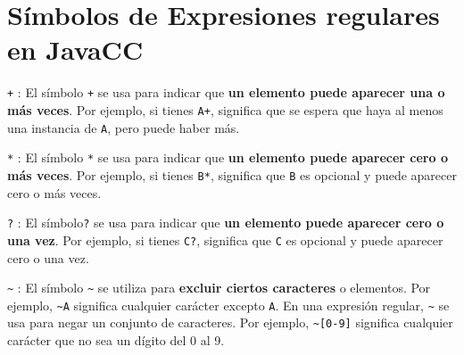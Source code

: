 \section{Símbolos de Expresiones regulares en JavaCC}
\label{sec:simbolosdeexpresionesregulares}

\noindent \lstinline[basicstyle=\large\ttfamily]|+| : El símbolo \lstinline[basicstyle=\large\ttfamily]|+| se usa para indicar que \textbf{un elemento puede aparecer una o más veces}. Por ejemplo, si tienes \lstinline[basicstyle=\large\ttfamily]|A+|, significa que se espera que haya al menos una instancia de \lstinline[basicstyle=\large\ttfamily]|A|, pero puede haber más.

\noindent \lstinline[basicstyle=\large\ttfamily]|*| : El símbolo \lstinline[basicstyle=\large\ttfamily]|*| se usa para indicar que \textbf{un elemento puede aparecer cero o más veces}. Por ejemplo, si tienes \lstinline[basicstyle=\large\ttfamily]|B*|, significa que \lstinline[basicstyle=\large\ttfamily]|B| es opcional y puede aparecer cero o más veces.

\noindent \lstinline[basicstyle=\large\ttfamily]|?| : El símbolo\lstinline[basicstyle=\large\ttfamily]|?| se usa para indicar que \textbf{un elemento puede aparecer cero o una vez}. Por ejemplo, si tienes \lstinline[basicstyle=\large\ttfamily]|C?|, significa que \lstinline[basicstyle=\large\ttfamily]|C| es opcional y puede aparecer cero o una vez.


\noindent \lstinline[basicstyle=\large\ttfamily]|~| : El símbolo \lstinline[basicstyle=\large\ttfamily]|~| se utiliza para \textbf{excluir ciertos caracteres} o elementos. Por ejemplo, \lstinline[basicstyle=\large\ttfamily]|~A| significa cualquier carácter excepto \lstinline[basicstyle=\large\ttfamily]|A|. En una expresión regular, \lstinline[basicstyle=\large\ttfamily]|~| se usa para negar un conjunto de caracteres. Por ejemplo, \lstinline[basicstyle=\large\ttfamily]|~[0-9]| significa cualquier carácter que no sea un dígito del 0 al 9.

